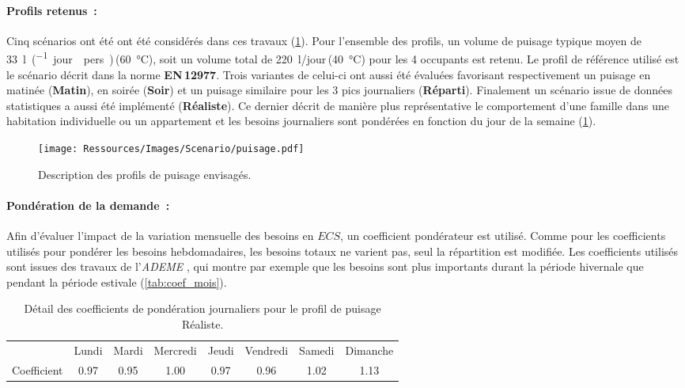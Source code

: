 \paragraph{Profils retenus~:} %
\label{par:profils_retenus}
Cinq scénarios ont été ont été considérés dans ces travaux (\ref{fig:profil_puisage}). Pour
l’ensemble des profils, un volume de puisage typique moyen de
\SI{33}{\litre\per(jour\period pers)}\,(\SI{60}{\celsius}), soit un
volume total de \SI{220}{\litre/jour}\,(\SI{40}{\celsius}) pour les 4 occupants est
retenu. Le profil de référence utilisé est le scénario décrit dans la norme
\textbf{EN\,12977}. Trois variantes de celui-ci ont aussi été évaluées favorisant
respectivement un puisage en matinée (\textbf{Matin}), en soirée (\textbf{Soir}) et un
puisage similaire pour les 3 pics journaliers (\textbf{Réparti}). Finalement un scénario
issue de données statistiques \parencite{ADEME2016} a aussi été implémenté
(\textbf{Réaliste}). Ce dernier décrit de manière plus représentative le comportement
d’une famille dans une habitation individuelle ou un appartement et les besoins
journaliers sont pondérées en fonction du jour de la semaine (\ref{tab:coef_semaine}).
\begin{figure}
    \begin{center}
        \texttt{[image: Ressources/Images/Scenario/puisage.pdf]}
    \end{center}
    \caption{Description des profils de puisage envisagés.
             \label{fig:profil_puisage}}
\end{figure}

\paragraph{Pondération de la demande~:} %
\label{par:ponderation_de_la_demande}
Afin d’évaluer l’impact de la variation mensuelle des besoins en $ECS$, un
coefficient pondérateur est utilisé. Comme pour les coefficients utilisés pour pondérer
les besoins hebdomadaires, les besoins totaux ne varient pas, seul la répartition est
modifiée. Les coefficients utilisés sont issues des travaux de l’\textit{ADEME}
\parencite{ADEME2016}, qui montre par exemple que les besoins sont plus importants durant
la période hivernale que pendant la période estivale (\ref{tab:coef_mois}).

\begin{table}
\centering
\begin{tabular}{l*{7}{c}}
    \toprule
                & Lundi & Mardi & Mercredi & Jeudi & Vendredi & Samedi & Dimanche \\
    \cmidrule[\lightrulewidth](){2-8}
    Coefficient & \num{0.97}  & \num{0.95}  & \num{1.00}     & \num{0.97}  & \num{0.96}     & \num{1.02}   & \num{1.13}     \\
    \bottomrule
\end{tabular}
\caption{Détail des coefficients de pondération journaliers pour le profil de
         puisage Réaliste.}
         \label{tab:coef_semaine}
\end{table}

